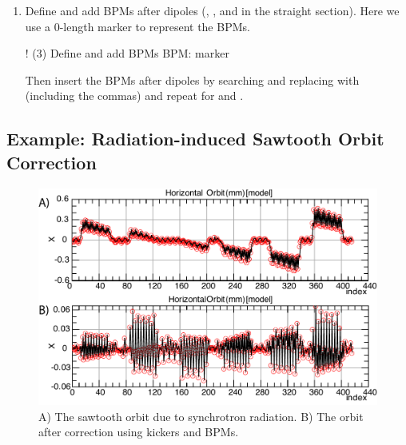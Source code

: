 \documentclass{hitec}     %
\begin{document}
{{{{\begin{enumerate}[leftmargin=*]
Because we have used D1 drifts repeatedly throughout the ring, adding correctors manually is a tedious task. The easiest approach is to use  in Find and Replace. The recipe is the following: 
\begin{code}
1. In the forward arcs for drifts after focusing quadrupoles:
    Replace (QF[^,\n]*,[^,\n]*)D1 with \1D1C1, CH, D1C2 for 
2. In the forward arcs for drifts after defocusing quadrupoles:
    Replace (QD[^,\n]*,[^,\n]*)D1 with \1D1C1, CV, D1C2
3. In the reverse arcs for drifts before focusing quadrupoles:
    Replace (D1)([^,\n]*,[^,\n]*QF), with D1C2, CH, D1C1. In the reverse arcs for drifts before defocusing quadrupoles:
    Replace (D1)([^,\n]*,[^,\n]*QD), with D1C2, CV, D1C1. In the reverse arcs for drifts at the end of a cell:
    Replace D1) with D1C2, CH, D1C1) 
\end{code}
In some text editors, you may need to use \$1 and \$2 instead of \textbackslash 1 and \textbackslash 2.
\item Define and add BPMs after dipoles (, , and  in the straight section). Here we use a 0-length marker to represent the BPMs.
\begin{code}
! (3) Define and add BPMs
BPM: marker
\end{code}
Then insert the BPMs after dipoles by searching and replacing  with  (including the commas) and repeat for  and .
\end{enumerate}

\subsection{Example: Radiation-induced Sawtooth Orbit Correction}
\label{s:sawtooth}

\begin{figure}[!h]
  \centering
  \includegraphics[width=0.9\linewidth]{figures/sawtooth.pdf}
  \caption{A) The sawtooth orbit due to synchrotron radiation. B) The orbit after correction using kickers and BPMs.}
  \label{f:sawtooth}
\end{figure}

}}}}
\end{document}
